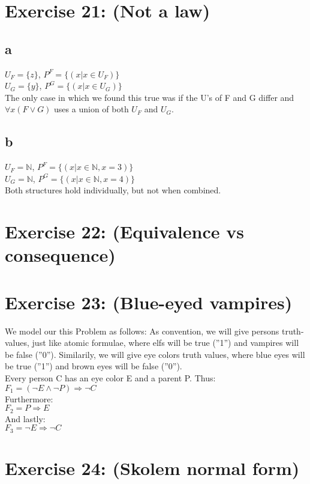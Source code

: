 \documentclass[12pt]{article}
\newcommand{\N}{\mathbb N}
\begin{document}
 

\rhead{\today}


\section*{Exercise 21: (Not a law)}

\subsection*{a}

$U_F = \{z\}$, $P^F=\{(x | x \in U_F)\}$\\
$U_G = \{y\}$, $P^G=\{(x | x \in U_G)\}$\\
The only case in which we found this true was if the U's of F and G differ and $\forall x(F \lor G)$ uses a union of both $U_F$ and $U_G$. 

\subsection*{b}

$U_F = \N$, $P^F=\{(x | x \in \N, x=3)\}$\\
$U_G = \N$, $P^G=\{(x | x \in \N, x=4)\}$\\
Both structures hold individually, but not when combined.

\section*{Exercise 22: (Equivalence vs consequence)}

\section*{Exercise 23: (Blue-eyed vampires)}

We model our this Problem as follows: As convention, we will give persons truth-values, just like atomic formulae, where elfs will be true (”1”) and vampires will be false (”0”). Similarily, we will give eye colors truth values, where blue eyes will be true (”1”) and brown eyes will be false (”0”).\\
Every person C has an eye color E and a parent P. Thus:\\
$F_1= (\lnot E \land \lnot P) \Rightarrow \lnot C$\\
Furthermore:\\
$F_2= P \Rightarrow E$\\
And lastly:\\
$F_3=\lnot E \Rightarrow \lnot C$

\section*{Exercise 24: (Skolem normal form)}

\end{document}
